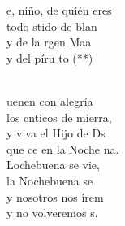 \documentclass[12pt]{article}
\begin{document}
\begin{multicols*}{2}
\begin{cancion}%
	\begin{chorus}%
	e, niño, de quién eres\\
	todo stido de blan\\
	y de la rgen Maa\\
	y del píru to (**)\\
	\end{chorus}%
	\jump\\
	uenen con alegría\\
	los cnticos de mierra,\\
	y viva el Hijo de Ds\\
	que ce en la Noche na.\\
\jump
	Lochebuena se vie,\\
	la Nochebuena se \\
	y nosotros nos irem\\
	y no volveremos s.\\
\end{cancion}%


\end{multicols*}
\end{document}
